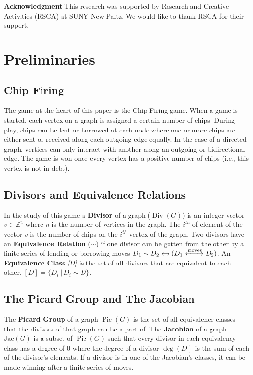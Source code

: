 \documentclass[11pt,reqno]{amsart}
\DeclareMathOperator{\Pic}{Pic}
\DeclareMathOperator{\Div}{Div}
\DeclareMathOperator{\Deg}{deg}
\newcommand{\Jac}{\textrm{Jac}}{}
\theoremstyle{definition}
\theoremstyle{plain}
\begin{document}
\bigskip

\textbf{Acknowledgment}\hspace{0.1cm} This research was supported by Research and Creative Activities (RSCA) at
	SUNY New Paltz. We would like to thank RSCA for their support.

\section{Preliminaries}
	\subsection{Chip Firing}
		The game at the heart of this paper is the Chip-Firing game. When a game is started, each vertex on
		a graph is assigned a certain number of chips.  During play, chips can be lent or borrowed at each
		node where one or more chips are either sent or received along each outgoing edge equally.  In the
		case of a directed graph, vertices can only interact with another along an outgoing or
		bidirectional edge.  The game is won once every vertex has a positive number of chips (i.e., this
		vertex is not in debt).

	\subsection{Divisors and Equivalence Relations}
		In the study of this game a \textbf{Divisor} of a graph ($\Div(G)$) is an integer vector $v\in\mathbb{Z}^n$
		where \textit{n} is the number of vertices in the graph.  The $i^{th}$ of element of the vector \textit{v}
		is the number of chips on the $i^{th}$ vertex of the graph.  Two divisors have an \textbf{Equivalence Relation}
		($\sim$) if one divisor can be gotten from the other by a finite series of lending or borrowing moves
		$D_1 \sim D_2 \xleftrightarrow{} (D_1 \xleftrightarrow{\text{moves}} D_2)$.  An \textbf{Equivalence Class} \textit{[D]}
		is the set of all divisors that are equivalent to each other, $[D] = \{D_i~|~D_i \sim D\}$.

	\subsection{The Picard Group and The Jacobian}
		The \textbf{Picard Group} of a graph $\Pic(G)$ is the set of all equivalence classes that the
		divisors of that graph can be a  part of. The \textbf{Jacobian} of a graph  $\Jac(G)$ is a subset
		of $\Pic(G)$ such that every divisor in each equivalency class has a degree of $0$ where the
		degree of a divisor $\Deg(D)$ is the sum of each of the divisor's elements.
		If a divisor is in one of the Jacobian's classes, it can be made winning after a finite series of moves.
\end{document}
